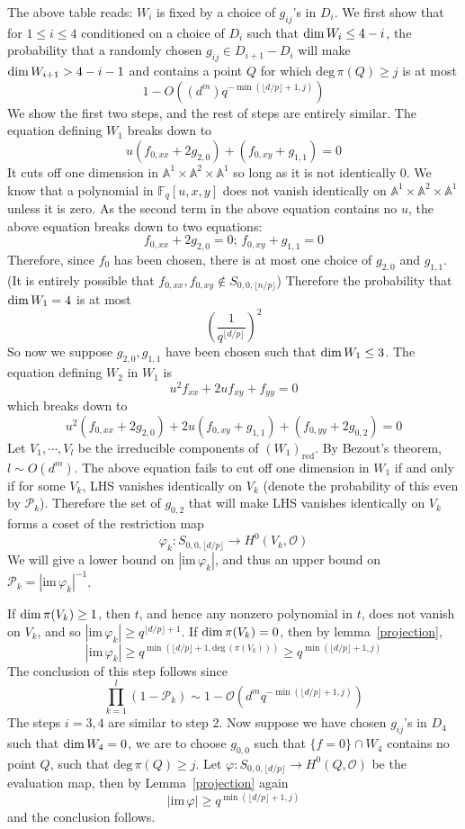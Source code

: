 \documentclass[12pt]{article}
\theoremstyle{plain}
\theoremstyle{definition}
\newcommand{\sP}{\mathcal{P}}
\newcommand{\IA}{\mathbb{A}}
\newcommand{\IF}{\mathbb{F}}
\newcommand{\sO}{\mathcal{O}}
\renewcommand{\deg}{\mathrm{deg}\,}
\renewcommand\dim{{\rm dim\,}}
\newcommand{\<}{\langle}
\renewcommand{\>}{\rangle}
\newcommand{\fl}[1]{\lfloor #1 \rfloor}
\newcommand{\im}{\mathrm{im}\,}
\begin{document}
The above table reads: $W_i$ is fixed by a choice of $g_{ij}$'s in $D_i$. We first show that for $1 \le i \le 4$ conditioned on a choice of $D_i$ such that $\dim W_i \le 4 - i$, the probability that a randomly chosen $g_{ij} \in D_{i + 1} - D_i$ will make $\dim W_{i + 1} > 4 - i - 1$ and contains a point $Q$ for which $\deg \pi(Q) \ge j$ is at most
$$ 1 - O((d^m) q^{-\min(\fl{d/p} + 1, j)}) $$
We show the first two steps, and the rest of steps are entirely similar. The equation defining $W_1$ breaks down to 
$$ u(f_{0, xx} + 2g_{2, 0}) + (f_{0, xy} + g_{1, 1}) = 0$$ 
It cuts off one dimension in $\IA^1 \times \IA^2 \times \IA^1$ so long as it is not identically $0$. We know that a polynomial in $\IF_q[u, x, y]$ does not vanish identically on $\IA^1 \times \IA^2 \times \IA^1$ unless it is zero. As the second term in the above equation contains no $u$, the above equation breaks down to two equations:
$$ f_{0, xx} + 2g_{2, 0} = 0; \, f_{0, xy} + g_{1, 1} = 0$$
Therefore, since $f_0$ has been chosen, there is at most one choice of $g_{2, 0}$ and $g_{1, 1}$. (It is entirely possible that $f_{0, xx}, f_{0, xy} \not\in S_{0, 0, \fl{n/p}}$) Therefore the probability that $\dim W_1 = 4$ is at most
$$ (\frac{1}{q^{\fl{d/p}}})^2$$
So now we suppose $g_{2,0}, g_{1,1}$ have been chosen such that $\dim W_1 \le 3$. The equation defining $W_2$ in $W_1$ is 
$$ u^2 f_{xx} + 2u f_{xy} + f_{yy} = 0 $$
which breaks down to 
$$ u^2(f_{0, xx} + 2 g_{2, 0}) + 2u(f_{0, xy} + g_{1, 1}) + (f_{0, yy} + 2 g_{0, 2}) = 0 $$
Let $V_1, \cdots, V_l$ be the irreducible components of $(W_1)_{\mathrm{red}}$. By Bezout's theorem, $l \sim O(d^m)$. The above equation fails to cut off one dimension in $W_1$ if and only if for some $V_k$, LHS vanishes identically on $V_k$ (denote the probability of this even by $\sP_k$). Therefore the set of $g_{0, 2}$ that will make LHS vanishes identically on $V_k$ forms a coset of the restriction map 
$$ \varphi_k : S_{0, 0, \fl{d/p}} \to H^0(V_k, \sO) $$
We will give a lower bound on $|\im \varphi_k|$, and thus an upper bound on $\sP_k = |\im \varphi_k|^{-1}$. 

If $\dim \pi(V_k) \ge 1$, then $t$, and hence any nonzero polynomial in $t$, does not vanish on $V_k$, and so $|\im \varphi_k| \ge q^{\fl{d/p} + 1}$. If $\dim \pi(V_k) = 0$, then by lemma~\ref{projection}, 
$$ |\im \varphi_k| \ge q^{\min(\fl{d/p} + 1, \deg(\pi(V_k)))} \ge q^{\min(\fl{d/p} + 1, j)} $$
The conclusion of this step follows since 
$$ \prod_{k = 1}^l (1 - \sP_k) \sim 1 - \sO(d^m q^{-\min(\fl{d/p} + 1, j)})$$
The steps $i = 3, 4$ are similar to step 2. Now suppose we have chosen $g_{ij}$'s in $D_4$ such that $\dim W_4 = 0$, we are to choose $g_{0, 0}$ such that $\{f=0 \} \cap W_4$ contains no point $Q$, such that $\deg \pi({Q}) \ge j$. Let $\varphi : S_{0, 0, \fl{d/p}} \to H^0(Q, \sO)$ be the evaluation map, then by Lemma~\ref{projection} again 
$$ |\im \varphi| \ge q^{\min(\fl{d/p} + 1, j)} $$
and the conclusion follows. 
\end{document}
